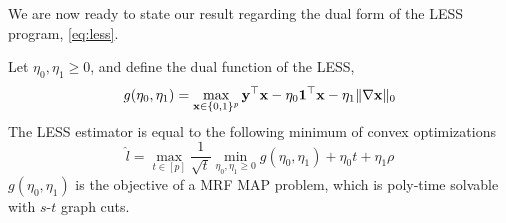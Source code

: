 We are now ready to state our result regarding the dual form of the LESS program, \eqref{eq:less}.
\begin{proposition}
\label{prop:less_alg}
Let $\eta_0, \eta_1 \ge 0$, and define the dual function of the LESS,
\[
g(\eta_0,\eta_1) = \max_{\mathbf{x} \in \{0,1\}^p} \mathbf{y}^\top \mathbf{x} - \eta_0 {\bf 1}^\top \mathbf{x} - \eta_1 \| \nabla \mathbf{x} \|_0
\]
The LESS estimator is equal to the following minimum of convex optimizations
\[
\hat l = \max_{t \in [p]} \frac{1}{\sqrt{t}} \min_{\eta_0,\eta_1 \ge 0} g(\eta_0,\eta_1) + \eta_0 t + \eta_1 \rho
\]
$g(\eta_0,\eta_1)$ is the objective of a MRF MAP problem, which is poly-time solvable with $s$-$t$ graph cuts.
\end{proposition}
